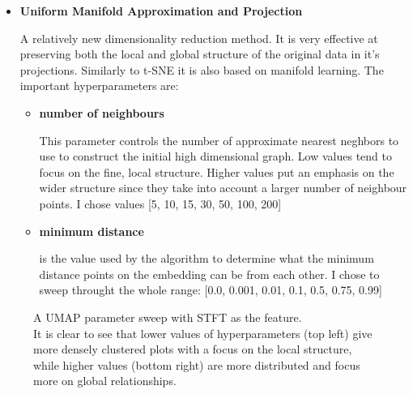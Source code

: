 \documentclass[a4paper, 12pt, twoside]{report}
\begin{document}
\begin{itemize}
\item \textbf{Uniform Manifold Approximation and Projection}

A relatively new dimensionality reduction method. It is very effective at preserving both the local and global structure of the original data in it's projections. Similarly to t-SNE it is also based on manifold learning. The important hyperparameters are:
\begin{itemize}
\item \textbf{ number of neighbours }

This parameter controls the number of approximate nearest neghbors to use to construct the initial high dimensional graph. Low values tend to focus on the fine, local structure. Higher values put an emphasis on the wider structure since they take into account a larger number of neighbour points. I chose values [5, 10, 15, 30, 50, 100, 200]

  \item \textbf{ minimum distance }

is the value used by the algorithm to determine what the minimum distance points on the embedding can be from each other. I chose to sweep throught the whole range: [0.0, 0.001, 0.01, 0.1, 0.5, 0.75, 0.99]
\end{itemize}
\end{itemize}

\begin{figure}[h!tbp]
\centering
{}
\caption{A UMAP parameter sweep with STFT as the feature.\\ It is clear to see that lower values of hyperparameters (top left) give more densely clustered plots with a focus on the local structure, while higher values (bottom right) are more distributed and focus more on global relationships.}
\end{figure}
\end{document}
